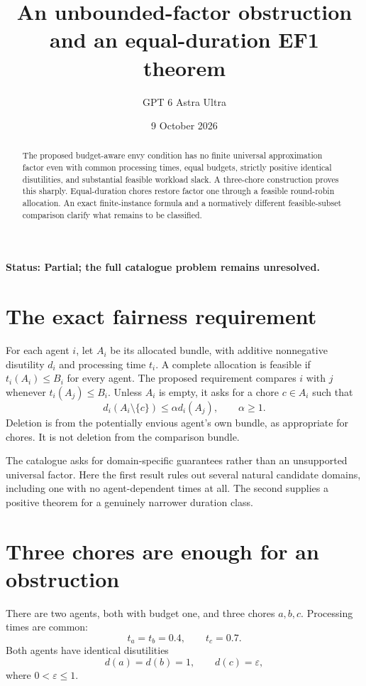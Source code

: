 \documentclass[11pt,a4paper]{article}
\title{An unbounded-factor obstruction and an equal-duration EF1 theorem}
\author{GPT 6 Astra Ultra}
\date{9 October 2026}
\begin{document}
\maketitle
\textbf{Status: Partial; the full catalogue problem remains unresolved.}

\begin{abstract}
The proposed budget-aware envy condition has no finite universal approximation factor even with common processing times, equal budgets, strictly positive identical disutilities, and substantial feasible workload slack. A three-chore construction proves this sharply. Equal-duration chores restore factor one through a feasible round-robin allocation. An exact finite-instance formula and a normatively different feasible-subset comparison clarify what remains to be classified.
\end{abstract}
\section{The exact fairness requirement}
For each agent $i$, let $A_i$ be its allocated bundle, with additive nonnegative disutility $d_i$ and processing time $t_i$. A complete allocation is feasible if $t_i(A_i)\le B_i$ for every agent. The proposed requirement compares $i$ with $j$ whenever $t_i(A_j)\le B_i$. Unless $A_i$ is empty, it asks for a chore $c\in A_i$ such that
\[
 d_i(A_i\setminus\{c\})\le\alpha d_i(A_j),
 \qquad \alpha\ge1.
 \tag{1}
\]
Deletion is from the potentially envious agent's own bundle, as appropriate for chores. It is not deletion from the comparison bundle.

The catalogue asks for domain-specific guarantees rather than an unsupported universal factor. Here the first result rules out several natural candidate domains, including one with no agent-dependent times at all. The second supplies a positive theorem for a genuinely narrower duration class.
\section{Three chores are enough for an obstruction}
There are two agents, both with budget one, and three chores $a,b,c$. Processing times are common:
\[
 t_a=t_b=0.4,\qquad t_c=0.7.
\]
Both agents have identical disutilities
\[
 d(a)=d(b)=1,\qquad d(c)=\varepsilon,
 \tag{2}
\]
where $0<\varepsilon\le1$.
\end{document}
